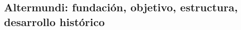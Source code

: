 \begin{comment}
  \begin{itemize}
    \item conectar a comunidades excluidas por los proveedores convencionales de servicios Internet
    \item garantizar acceso libre a información
    \item garantizar la libertad de expreción
    \item profundizar los propios conocimientos técnicos, experimentar
    \item educar y concienciar a más gente
  \end{itemize}

anti sistemas autocratas:
"Anlässe für dieses neuerliche Interesse sind etwa die Versuche in autoritären
Staaten, das Internet komplett abzuschalten, um den Informationsaustausch
zu verhindern."[p.12][Mabb2014]

auch fuer Katastrophenfaelle relevant
"Ein weiteres Einsatzfeld sind Mesh-Netze im Katastrophenfall, besonders nach
Naturkatastrophen. So nutzten etwa nach dem Hurrikan Sandy Bürger im Brook-
lyner Viertel Red Hook ein solches, bereits vorhandenes und weiter funktionsfä-
higes Netz. Es wurde um einen Dienst erweitert, über den Bewohner Schäden ­
melden und lokale Informationen austauschen konnten. Zusammen mit der
Katastrophenschutzbehörde wurde das lokale Netz provisorisch per Satellit
ans Internet angebunden. Der dort eingesetzte technische Werkzeugkasten
des „Commotion Wireless Project“ teilt viele Komponenten mit dem deutschen
Freifunk."[p.12][Mabb2014]

bridging the digital devide!

surgen de necesidades locales:
por ejemplo en el caso de Altermundi: pequeños pueblos, poblaciones en las altas cumbres; localidades donde los proveedores convencionales no ven oportunidad de lucro y por eso no prestan servicio

se ubican en el contexto del ciberoptimismo (DEF)

reflexión crítica: está la solución fiable en gran escala: vgl papel del estado (IV Gui); última milla
\end{comment}

\subsection{Altermundi: fundación, objetivo, estructura, desarrollo histórico}
\begin{comment}
* existe en su forma actual desde 2012
* objetivo: facilitar la construcción y el mantenimiento de redes comunitarias inalámbricas
* grupo básico de activistas + redes locales autónomas
* educar y concienciar: talleres, empoderamiento, el grupo central en papel consultativo
* la comunidad decide
\end{comment}

